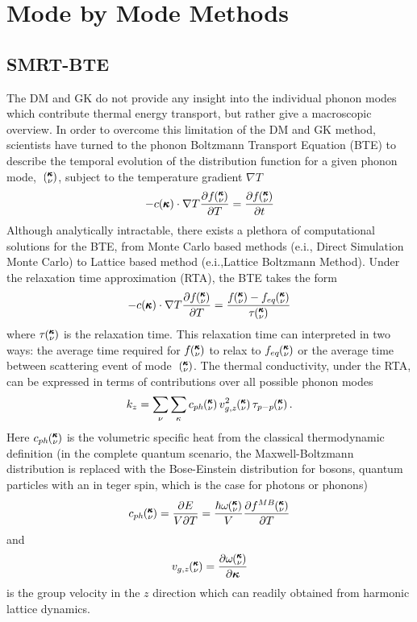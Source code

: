 \section{Mode by Mode Methods}
\subsection{SMRT-BTE}
%
The DM and GK do not provide any insight into the individual phonon modes which contribute thermal energy transport, but rather give a macroscopic overview. In order to overcome this limitation of the DM and GK method, scientists have turned to the phonon Boltzmann Transport Equation (BTE) to describe the temporal evolution of the distribution function for a given phonon mode, ~$\mspace{-4.0mu}\left(\mspace{-8.0mu} \begin{smallmatrix}&\pmb{\kappa} \\&\nu\end{smallmatrix} \mspace{-3.0mu}\right)$, subject to the temperature gradient $\nabla T$ \cite{srivastava1990physics} 
%
\begin{equation}\label{EQ:BTE}
-c(\pmb{\kappa})\cdot \nabla T\frac{\partial f\mspace{-4.0mu}\left(\mspace{-8.0mu} \begin{smallmatrix}&\pmb{\kappa} \\&\nu\end{smallmatrix} \mspace{-3.0mu}\right)}{\partial T}=\frac{\partial f\mspace{-4.0mu}\left(\mspace{-8.0mu} \begin{smallmatrix}&\pmb{\kappa} \\&\nu\end{smallmatrix} \mspace{-3.0mu}\right)}{\partial t}
\end{equation}
%
Although analytically intractable, there exists a plethora of computational solutions for the BTE, from Monte Carlo based methods (e.i., Direct Simulation Monte Carlo)\cite{} to Lattice based method (e.i.,Lattice Boltzmann Method).\cite{} Under the relaxation time approximation (RTA), the BTE takes the form
%
\begin{equation}\label{EQ:BTE_lin}
-c(\pmb{\kappa})\cdot \nabla T\frac{\partial f\kv}{\partial T}=\frac{f\kv-f_{eq}\kv}{\tau \kv}
\end{equation}
%
where $\tau \mspace{-4.0mu}\left(\mspace{-8.0mu} \begin{smallmatrix}&\pmb{\kappa} \\&\nu\end{smallmatrix} \mspace{-3.0mu}\right)$ is the relaxation time. This relaxation time can interpreted in two ways: the average time required for $f\mspace{-4.0mu}\left(\mspace{-8.0mu} \begin{smallmatrix}&\pmb{\kappa} \\&\nu\end{smallmatrix} \mspace{-3.0mu}\right)$ to relax to $f_{eq}\mspace{-4.0mu}\left(\mspace{-8.0mu} \begin{smallmatrix}&\pmb{\kappa} \\&\nu\end{smallmatrix} \mspace{-3.0mu}\right)$ or the average time between scattering event of mode ~$\mspace{-4.0mu}\left(\mspace{-8.0mu} \begin{smallmatrix}&\pmb{\kappa} \\&\nu\end{smallmatrix} \mspace{-3.0mu}\right)$. The thermal conductivity, under the RTA, can be expressed in terms of contributions over all possible phonon modes \cite{srivastava1990physics}
%
\begin{equation}\label{EQ:k_RTA}
	k_{z}= \sum_\nu\sum_\kappa c_{ph}\kv v^2_{g,z}\kv\tau_{p-p}\kv.
\end{equation}
%
Here $c_{ph}\mspace{-4.0mu}\left(\mspace{-8.0mu} \begin{smallmatrix}&\pmb{\kappa} \\&\nu\end{smallmatrix} \mspace{-3.0mu}\right)$ is the volumetric specific heat from the classical thermodynamic definition (in the complete quantum scenario, the Maxwell-Boltzmann distribution is replaced with the Bose-Einstein distribution for bosons, quantum particles with an in
teger spin, which is the case for photons or phonons)
%
\begin{equation}\label{EQ:Cph}
c_{ph}\kv=\frac{\partial E}{V\partial T}=\frac{\hbar\omega\kv}{V}\frac{\partial f^{MB}\kv}{\partial T}	
\end{equation}
%
and
\begin{equation}\label{EQ:Vg}
v_{g,z}\mspace{-4.0mu}\left(\mspace{-8.0mu} \begin{smallmatrix}&\pmb{\kappa} \\&\nu\end{smallmatrix} \mspace{-3.0mu}\right)=\frac{\partial \omega\mspace{-4.0mu}\left(\mspace{-8.0mu} \begin{smallmatrix}&\pmb{\kappa} \\&\nu\end{smallmatrix} \mspace{-3.0mu}\right)}{\partial \bm{\kappa}}
\end{equation}
is the group velocity in the $z$ direction which can readily obtained from harmonic lattice dynamics. 

